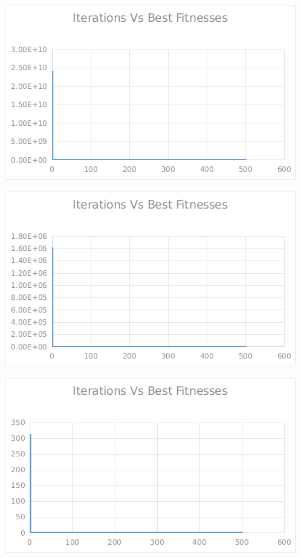 \documentclass[12pt]{article}
\begin{document}
					\begin{minipage}{0.6\linewidth}
						\includegraphics[width=\linewidth]{21.png}
					\end{minipage}
					\hfill
					\begin{minipage}{0.6\linewidth}
						\includegraphics[width=\linewidth]{22.png}
					\end{minipage}
					\begin{minipage}{0.6\linewidth}
						\includegraphics[width=\linewidth]{23.png}
					\end{minipage}
\end{document}
